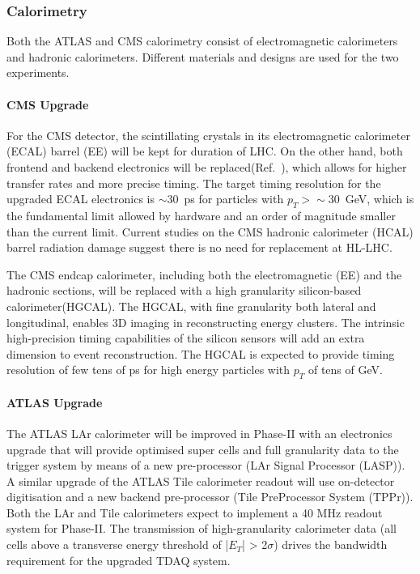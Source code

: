 \subsubsection{Calorimetry} \label{sec:upgradecalo}

Both the ATLAS and CMS calorimetry consist of electromagnetic calorimeters and hadronic calorimeters. Different materials and designs are used for the two experiments. 

\paragraph{CMS Upgrade} 
For the CMS detector, the scintillating crystals in its electromagnetic calorimeter (ECAL) barrel (EE) will be kept for duration of LHC. On the other hand, both frontend and backend electronics will be replaced(Ref.~\cite{Lourenco:2283187}), which allows for higher transfer rates and more precise timing. The target timing resolution for the upgraded ECAL electronics is $\sim30$~ps for particles with $p_T >\sim30$~GeV, which is the fundamental limit allowed by hardware and an order of magnitude smaller than the current limit. 
Current studies on the CMS hadronic calorimeter (HCAL) barrel radiation damage suggest there is no need for replacement at HL-LHC. 

The CMS endcap calorimeter, including both the electromagnetic (EE) and the hadronic sections, will be replaced with a high granularity silicon-based calorimeter(HGCAL). 
The HGCAL, with fine granularity both lateral and longitudinal, enables 3D imaging in reconstructing energy clusters.
The intrinsic high-precision timing capabilities of the silicon sensors will add an extra dimension to event reconstruction. The HGCAL is expected to provide timing resolution of few tens of ps for high energy particles with $p_T$ of tens of GeV. 

\paragraph{ATLAS Upgrade}

The ATLAS LAr calorimeter will be improved in Phase-II with an electronics upgrade that will
provide optimised super cells and full granularity data to the trigger system by means of a
new pre-processor (LAr Signal Processor (LASP)). A similar upgrade of the ATLAS Tile calorimeter
readout will use on-detector digitisation and a new backend pre-processor (Tile PreProcessor
System (TPPr)). Both the LAr and Tile calorimeters expect to implement a 40 MHz
readout system for Phase-II. 
The transmission of high-granularity calorimeter data (all cells above a transverse energy
threshold of |$E_T$| > 2$\sigma$) drives the bandwidth requirement for the upgraded TDAQ system.


